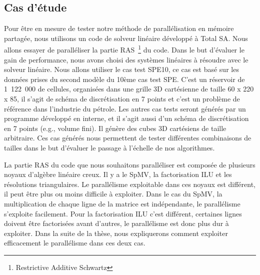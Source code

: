 \subsection{Cas d'étude}
Pour être en mesure de tester notre méthode de parallélisation en mémoire partagée, nous utilisons un code de solveur linéaire développé à Total SA.
%
Nous allons essayer de paralléliser la partie RAS~\footnote{Restrictive Additive Schwartz} du code.
%
Dans le but d'évaluer le gain de performance, nous avons choisi des systèmes linéaires à résoudre avec le solveur linéaire.
%
Nous allons utiliser le cas test SPE10, ce cas est basé sur les données prises du second modèle du 10ème cas test SPE\cite{SPE10}.
%
C'est un réservoir de 1~122~000 de cellules, organisées dans une grille 3D cartésienne de taille 60 x 220 x 85, il s'agit de schéma de discrétisation en 7 points et c'est un problème de référence dans l'industrie du pétrole.
%
Les autres cas tests seront générés par un programme développé en interne, et il s'agit aussi d'un schéma de discrétisation en 7 points (e.g., volume fini).
%
Il génère des cubes 3D cartésiens de taille arbitraire.
%
Ces cas générés nous permettent de tester différentes combinaisons de tailles dans le but d'évaluer le passage à l'échelle de nos algorithmes.


La partie RAS du code que nous souhaitons paralléliser est composée de plusieurs noyaux d'algèbre linéaire creux.
%
Il y a le SpMV, la factorisation ILU et les résolutions triangulaires.
%
Le parallélisme exploitable dans ces noyaux est différent, il peut être plus ou moins difficile à exploiter.
%
Dans le cas du SpMV, la multiplication de chaque ligne de la matrice est indépendante, le parallélisme s'exploite facilement.
%
Pour la factorisation ILU c'est différent, certaines lignes doivent être factorisées avant d'autres, le parallélisme est donc plus dur à exploiter.
%
Dans la suite de la thèse, nous expliquerons comment exploiter efficacement le parallélisme dans ces deux cas.
